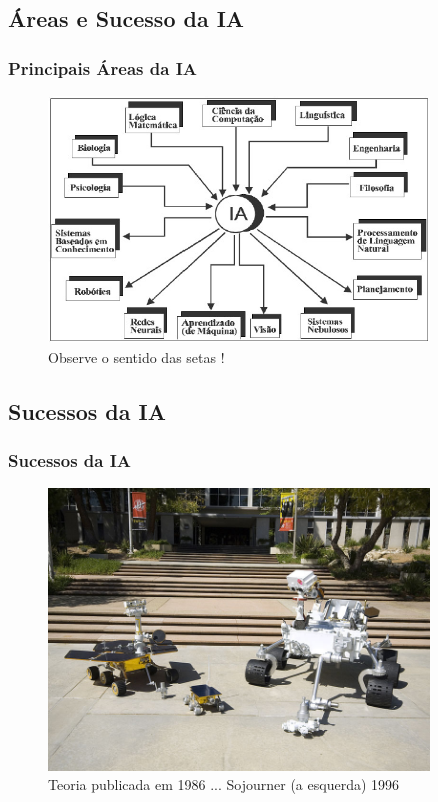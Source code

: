 \documentclass{beamer}
\begin{document}
\subsection{Áreas e Sucesso da IA}
\begin{frame}
\frametitle{Principais Áreas da IA}

\begin{figure}[ht!]
 \centering
 \includegraphics[width=0.9\textwidth , height=0.7\textheight]{figures/areas_da_IA.jpg}

\caption{Observe o sentido das setas !}

\end{figure}



\end{frame}


\subsection{Sucessos da IA}
\begin{frame}
\frametitle{Sucessos da IA}

\begin{figure}[ht!]
 \centering
 \includegraphics[width=0.9\textwidth , height=0.7\textheight]{figures/agente_ambiente.jpg}
 \caption{Teoria publicada em 1986 ... Sojourner (a esquerda) 1996}
 \end{figure}
\end{frame}
\end{document}
